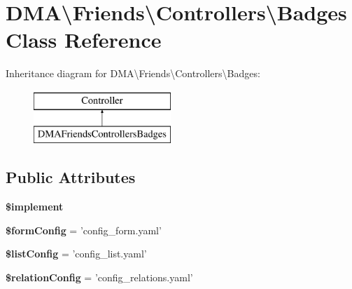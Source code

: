 \hypertarget{classDMA_1_1Friends_1_1Controllers_1_1Badges}{\section{D\+M\+A\textbackslash{}Friends\textbackslash{}Controllers\textbackslash{}Badges Class Reference}
\label{classDMA_1_1Friends_1_1Controllers_1_1Badges}
}
Inheritance diagram for D\+M\+A\textbackslash{}Friends\textbackslash{}Controllers\textbackslash{}Badges\+:\begin{figure}[H]
\begin{center}
\leavevmode
\includegraphics[height=2.000000cm]{d2/d27/classDMA_1_1Friends_1_1Controllers_1_1Badges}
\end{center}
\end{figure}
\subsection*{Public Attributes}
\begin{DoxyCompactItemize}
\item 
{\bfseries \$implement}
\item 
\hypertarget{classDMA_1_1Friends_1_1Controllers_1_1Badges_acc1326493cec81e89163a9f917990fc5}{{\bfseries \$form\+Config} = 'config\+\_\+form.\+yaml'}\label{classDMA_1_1Friends_1_1Controllers_1_1Badges_acc1326493cec81e89163a9f917990fc5}

\item 
\hypertarget{classDMA_1_1Friends_1_1Controllers_1_1Badges_a334b46e1ea9b57d53e297c4a5f93e045}{{\bfseries \$list\+Config} = 'config\+\_\+list.\+yaml'}\label{classDMA_1_1Friends_1_1Controllers_1_1Badges_a334b46e1ea9b57d53e297c4a5f93e045}

\item 
\hypertarget{classDMA_1_1Friends_1_1Controllers_1_1Badges_a70621d9f81b7f23a330e7f08dbdb7ce9}{{\bfseries \$relation\+Config} = 'config\+\_\+relations.\+yaml'}\label{classDMA_1_1Friends_1_1Controllers_1_1Badges_a70621d9f81b7f23a330e7f08dbdb7ce9}

\end{DoxyCompactItemize}


